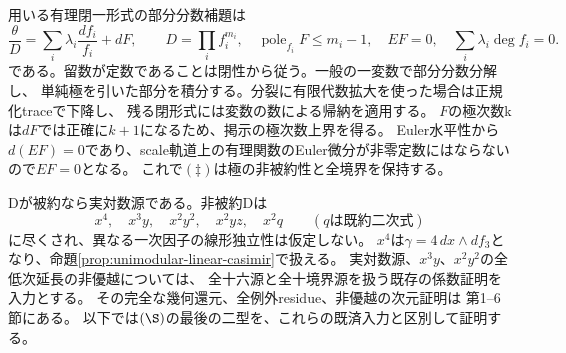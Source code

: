 \documentclass[a4paper,11pt]{ltjsarticle}
\theoremstyle{definition}
\begin{document}
用いる有理閉一形式の部分分数補題は
\[
 \frac\theta D=\sum_i\lambda_i\frac{df_i}{f_i}+dF,
 \qquad D=\prod_i f_i^{m_i},\quad
 \operatorname{pole}_{f_i}F\le m_i-1,\quad
 EF=0,\quad\sum_i\lambda_i\deg f_i=0.                         \tag{\ddagger}
\]
である。留数が定数であることは閉性から従う。一般の一変数で部分分数分解し、
単純極を引いた部分を積分する。分裂に有限代数拡大を使った場合は正規化traceで下降し、
残る閉形式には変数の数による帰納を適用する。
$F$の極次数kは$dF$では正確に$k+1$になるため、掲示の極次数上界を得る。
Euler水平性から$d(EF)=0$であり、scale軌道上の有理関数のEuler微分が非零定数にはならないので$EF=0$となる。
これで$(\ddagger)$は極の非被約性と全境界を保持する。

Dが被約なら実対数源である。非被約Dは
\[
 x^4,\quad x^3y,\quad x^2y^2,\quad x^2yz,\quad x^2q
 \qquad(q\text{は既約二次式})                              \tag{\S}
\]
に尽くされ、異なる一次因子の線形独立性は仮定しない。
$x^4$は$\gamma=4\,dx\wedge df_3$となり、命題\ref{prop:unimodular-linear-casimir}で扱える。
実対数源、$x^3y$、$x^2y^2$の全低次延長の非優越については、
全十六源と全十境界源を扱う既存の係数証明を入力とする。
その完全な幾何還元、全例外residue、非優越の次元証明は
第1--6節にある。
以下では$(\S)$の最後の二型を、これらの既済入力と区別して証明する。
\end{document}
